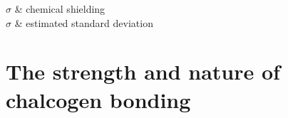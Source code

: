 \documentclass[a4paper, 12pt]{Thesis}  %
\begin{document}

\clearpage  %
{
$\sigma$ & chemical shielding\\
$\sigma$ & estimated standard deviation\\
}

\clearpage

\mainmatter	  %
\pagestyle{fancy}  %




\part{The strength and nature of chalcogen bonding}




\end{document}

